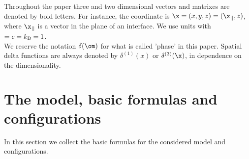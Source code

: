 \documentclass[notitlepage,prd,aps,longbibliography,twocolumn]{revtex4-1}
\begin{document}
Throughout the paper three and two dimensional vectors and matrixes are denoted by bold letters. For instance, the coordinate is $\x=(x,y,z)=(\x_{||},z)$, where $\x_{||}$ is a vector in the plane  of an interface.
We use units with $\hbar=c=k_{\rm B}=1$.
\renewcommand{\hbar}{} %
\\
We reserve the notation $\delta(\om)$ for what is called 'phase' in this paper. Spatial delta functions are always denoted by $\delta^{(1)}(x)$ or
$\delta^{(3)}(\x)$, in dependence on the dimensionality.
%
\section{\label{T2}The model, basic formulas and configurations}
%
In this section we collect the basic formulas for the considered model and configurations.
%
\end{document}
